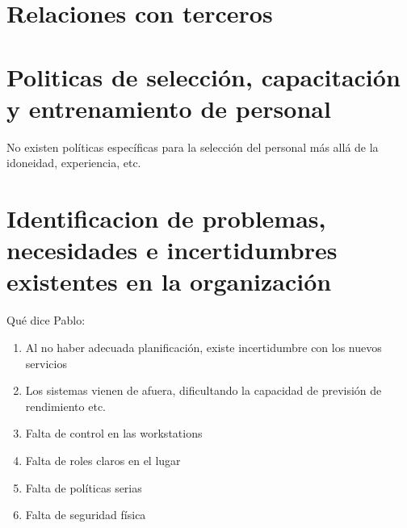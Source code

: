 \documentclass[a4paper,11pt,oneside]{article}
\begin{document}
\section{Relaciones con terceros}



\section{Politicas de selección, capacitación y entrenamiento de personal}

No existen políticas específicas para la selección del personal más
allá de la idoneidad, experiencia, etc.

\section{Identificacion de problemas, necesidades e incertidumbres existentes en la organización}

Qué dice Pablo:
\begin{enumerate}
\item Al no haber adecuada planificación, existe incertidumbre con los
  nuevos servicios
\item Los sistemas vienen de afuera, dificultando la capacidad de
  previsión de rendimiento etc.
\item Falta de control en las workstations
\item Falta de roles claros en el lugar
\item Falta de políticas serias
\item Falta de seguridad física
\end{enumerate}
\end{document}
